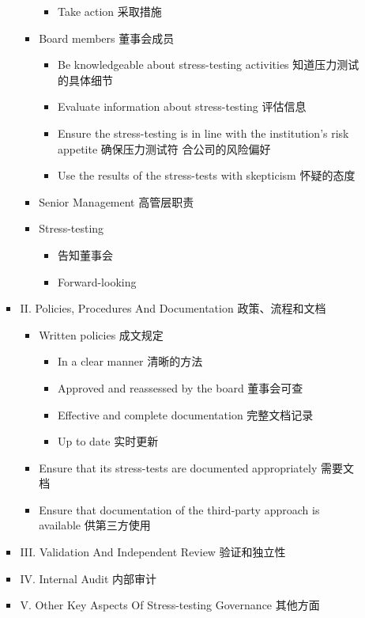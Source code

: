 \documentclass[a4paper,6pt,twoside,openany]{article}
\begin{document}
\begin{itemize}
\begin{itemize}
\begin{itemize}
\begin{itemize}
\begin{itemize}
      \item Take action 采取措施
      \end{itemize}
    \item Board members 董事会成员
      \begin{itemize}
      \item Be knowledgeable about stress-testing activities 知道压力测试的具体细节
      \item Evaluate information about stress-testing 评估信息
      \item Ensure the stress-testing is in line with the institution’s risk appetite 确保压力测试符
        合公司的风险偏好
      \item Use the results of the stress-tests with skepticism 怀疑的态度
      \end{itemize}
    \item Senior Management 高管层职责
    \item Stress-testing
      \begin{itemize}
      \item 告知董事会
      \item Forward-looking
      \end{itemize}
    \end{itemize}
  \item II. Policies, Procedures And Documentation 政策、流程和文档
    \begin{itemize}
    \item Written policies 成文规定
      \begin{itemize}
      \item In a clear manner 清晰的方法
      \item Approved and reassessed by the board 董事会可查
      \item Effective and complete documentation 完整文档记录
      \item Up to date 实时更新
      \end{itemize}
    \item Ensure that its stress-tests are documented appropriately 需要文档
    \item Ensure that documentation of the third-party approach is available 供第三方使用
    \end{itemize}
  \item III. Validation And Independent Review 验证和独立性
  \item IV. Internal Audit 内部审计
  \item V. Other Key Aspects Of Stress-testing Governance 其他方面

\end{itemize}
\end{itemize}
\end{itemize}
\end{document}
